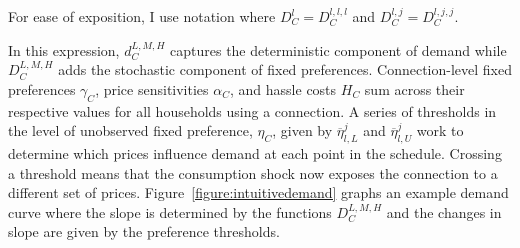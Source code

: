 \documentclass[12pt]{article}
\begin{document}
For ease of exposition, I use notation where $D^{l}_C=D^{l,l,l}_C$ and $D^{l,j}_C=D^{l,j,j}_C$.

In this expression, $d^{L,M,H}_C$ captures the deterministic component of demand while $D^{L,M,H}_C$ adds the stochastic component of fixed preferences.  Connection-level fixed preferences $\gamma_C$, price sensitivities $\alpha_C$, and  hassle costs $H_C$ sum across their respective values for all households using a connection.  A series of thresholds in the level of unobserved fixed preference, $\eta_C$, given by $\overline{\eta}^{j}_{l,L}$ and $\overline{\eta}^{j}_{l,U}$ work to determine which prices influence demand at each point in the schedule.  Crossing a threshold means that the consumption shock now exposes the connection to a different set of prices.  Figure~\ref{figure:intuitivedemand} graphs an example demand curve where the slope is determined by the functions $D^{L,M,H}_C$ and the changes in slope are given by the preference thresholds.

\end{document}

